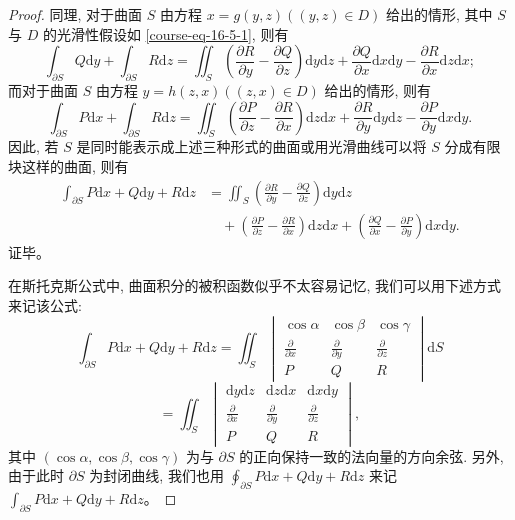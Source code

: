 \documentclass[12pt,fontset=fandol]{ctexart}
\begin{document}
\begin{proof}
同理, 对于曲面 $S$ 由方程 $x=g(y,z)((y,z)\in D)$ 给出的情形, 其中 $S$ 与 $D$ 的光滑性假设如 \eqref{course-eq-16-5-1}, 则有
\[
  \int_{\partial S}Q\mathrm dy+\int_{\partial S}R\mathrm dz
  =\iint_S\left(\frac{\partial R}{\partial y}-\frac{\partial Q}{\partial z}\right)\mathrm dy\mathrm dz
    +\frac{\partial Q}{\partial x}\mathrm dx\mathrm dy-\frac{\partial R}{\partial x}\mathrm dz\mathrm dx;
\]
而对于曲面 $S$ 由方程 $y=h(z,x)((z,x)\in D)$ 给出的情形, 则有
\[
  \int_{\partial S}P\mathrm dx+\int_{\partial S}R\mathrm dz
  =\iint_S\left(\frac{\partial P}{\partial z}-\frac{\partial R}{\partial x}\right)\mathrm dz\mathrm dx
    +\frac{\partial R}{\partial y}\mathrm dy\mathrm dz-\frac{\partial P}{\partial y}\mathrm dx\mathrm dy.
\]
因此, 若 $S$ 是同时能表示成上述三种形式的曲面或用光滑曲线可以将 $S$ 分成有限块这样的曲面, 则有
\[
\begin{aligned}
  \int_{\partial S}P\mathrm dx+Q\mathrm dy+R\mathrm dz
  &=\iint_S\left(\frac{\partial R}{\partial y}-\frac{\partial Q}{\partial z}\right)\mathrm dy\mathrm dz\\
  &\quad+\left(\frac{\partial P}{\partial z}-\frac{\partial R}{\partial x}\right)\mathrm dz\mathrm dx
    +\left(\frac{\partial Q}{\partial x}-\frac{\partial P}{\partial y}\right)\mathrm dx\mathrm dy.
\end{aligned}
\]
证毕。

在斯托克斯公式中, 曲面积分的被积函数似乎不太容易记忆, 我们可以用下述方式来记该公式:
\[
  \int_{\partial S}P\mathrm dx+Q\mathrm dy+R\mathrm dz
  =\iint_S
  \begin{vmatrix}
    \cos\alpha&\cos\beta&\cos\gamma\\
    \frac{\partial}{\partial x}&\frac{\partial}{\partial y}&\frac{\partial}{\partial z}\\
    P&Q&R
  \end{vmatrix}\mathrm dS
\]
\[
  =\iint_S
  \begin{vmatrix}
    \mathrm dy\mathrm dz&\mathrm dz\mathrm dx&\mathrm dx\mathrm dy\\
    \frac{\partial}{\partial x}&\frac{\partial}{\partial y}&\frac{\partial}{\partial z}\\
    P&Q&R
  \end{vmatrix},
\]
其中 $(\cos\alpha,\cos\beta,\cos\gamma)$ 为与 $\partial S$ 的正向保持一致的法向量的方向余弦. 另外, 由于此时 $\partial S$ 为封闭曲线, 我们也用 $\oint_{\partial S}P\mathrm dx+Q\mathrm dy+R\mathrm dz$ 来记 $\int_{\partial S}P\mathrm dx+Q\mathrm dy+R\mathrm dz$。

\end{proof}
\end{document}

